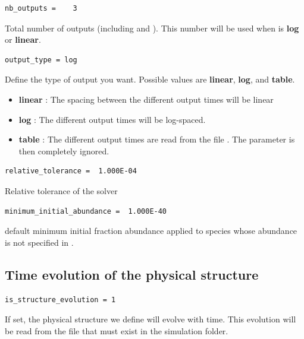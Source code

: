 \documentclass[english,a4paper,twoside]{article}
\begin{document}
\begin{verbatim}
nb_outputs =    3
\end{verbatim}
Total number of outputs (including  and ). This number will be used when  is \textbf{log} or \textbf{linear}.

\begin{verbatim}
output_type = log
\end{verbatim}
Define the type of output you want. Possible values are \textbf{linear}, \textbf{log}, and \textbf{table}. 
\begin{itemize}
\item \textbf{linear} : The spacing between the different output times will be linear
\item \textbf{log} : The different output times will be log-spaced.
\item \textbf{table} : The different output times are read from the file . The parameter  is then completely ignored.
\end{itemize}

\begin{verbatim}
relative_tolerance =  1.000E-04
\end{verbatim}
Relative tolerance of the solver

\begin{verbatim}
minimum_initial_abundance =  1.000E-40
\end{verbatim}
default minimum initial fraction abundance applied to species whose abundance is not specified in .

\subsection{Time evolution of the physical structure}\label{sec:time_structure}
\begin{verbatim}
is_structure_evolution = 1
\end{verbatim}

If set, the physical structure we define will evolve with time. This evolution will be read from the file  that must exist in the simulation folder. 
\end{document}
